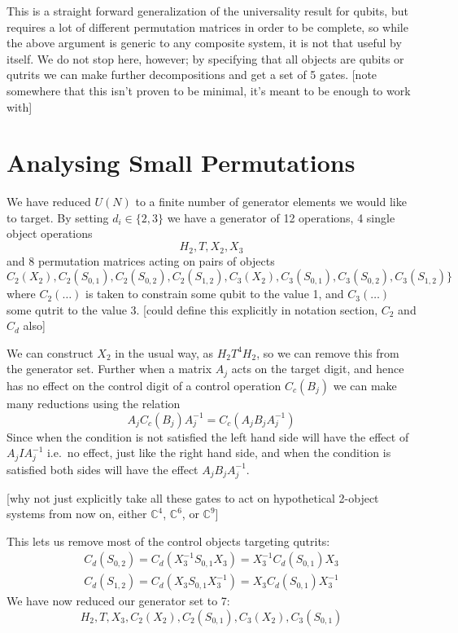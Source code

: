 This is a straight forward generalization of the universality result for qubits, but requires a lot of different permutation matrices in order to be complete, so while the above argument is generic to any composite system, it is not that useful by itself. We do not stop here, however; by specifying that all objects are qubits or qutrits we can make further decompositions and get a set of 5 gates. [note somewhere that this isn't proven to be minimal, it's meant to be enough to work with]
\section{Analysing Small Permutations}
We have reduced $U(N)$ to a finite number of generator elements we would like to target. By setting $d_i \in \{2, 3\}$ we have a generator of 12 operations, 4 single object operations
\[H_2, T, X_2, X_3\]
and 8 permutation matrices acting on pairs of objects
\[C_2(X_2), C_2(S_{0,1}), C_2(S_{0, 2}), C_2(S_{1, 2}), C_3(X_2), C_3(S_{0, 1}), C_3(S_{0, 2}), C_3(S_{1, 2})\}\]
where $C_2(\dots)$ is taken to constrain some qubit to the value 1, and $C_3(\dots)$ some qutrit to the value 3. [could define this explicitly in notation section, $C_2$ and $C_d$ also]

We can construct $X_2$ in the usual way, as $H_2T^4H_2$, so we can remove this from the generator set. Further when a matrix $A_j$ acts on the target digit, and hence has no effect on the control digit of a control operation $C_c(B_j)$ we can make many reductions using the relation
\[A_jC_c(B_j)A_j^{-1} = C_c(A_jB_jA_j^{-1})\]
Since when the condition is not satisfied the left hand side will have the effect of $A_jIA_j^{-1}$ i.e.\ no effect, just like the right hand side, and when the condition is satisfied both sides will have the effect $A_jB_jA_j^{-1}$.

[why not just explicitly take all these gates to act on hypothetical 2-object systems from now on, either $\mathbb{C}^4$, $\mathbb{C}^6$, or $\mathbb{C}^9$]

This lets us remove most of the control objects targeting qutrits:
\begin{align*}
C_d(S_{0, 2}) = C_d(X_3^{-1}S_{0,1}X_3) = X_3^{-1}C_d(S_{0,1})X_3
\\
C_d(S_{1, 2}) = C_d(X_3S_{0,1}X_3^{-1}) = X_3C_d(S_{0,1})X_3^{-1}
\end{align*}
We have now reduced our generator set to 7:
\[H_2, T, X_3, C_2(X_2), C_2(S_{0, 1}), C_3(X_2), C_3(S_{0, 1})\]

